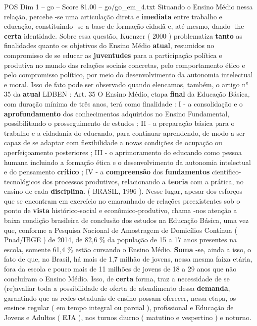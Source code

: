 \begin{textsample}{POS Dim 1 – go – Score 81.00 – go/go\_em\_4.txt}
Situando o Ensino Médio nessa relação, percebe -se uma articulação direta e \textbf{imediata} entre trabalho e educação, constituindo -se a base de formação cidadã e, até mesmo, dando -lhe \textbf{certa} identidade.
Sobre essa questão, Kuenzer ( 2000 ) problematiza \textbf{tanto} as finalidades quanto os objetivos do Ensino Médio \textbf{atual}, resumidos no compromisso de se educar as \textbf{juventudes} para a participação política e produtiva no mundo das relações sociais concretas, pelo comportamento ético e pelo compromisso político, por meio do desenvolvimento da autonomia intelectual e moral.
Isso de fato pode ser observado quando elencamos, também, o artigo n{\EmojiFont °} 35 da \textbf{atual} LDBEN : Art. 35 O Ensino Médio, etapa \textbf{final} da Educação Básica, com duração mínima de três anos, terá como finalidade : I - a consolidação e o \textbf{aprofundamento} dos conhecimentos adquiridos no Ensino Fundamental, possibilitando o prosseguimento de estudos ; II - a preparação básica para o trabalho e a cidadania do educando, para continuar aprendendo, de modo a ser capaz de se adaptar com flexibilidade a novas condições de ocupação ou aperfeiçoamento posteriores ; III - o aprimoramento do educando como pessoa humana incluindo a formação ética e o desenvolvimento da autonomia intelectual e do pensamento \textbf{crítico} ; IV - a \textbf{compreensão} dos \textbf{fundamentos} científico-tecnológicos dos processos produtivos, relacionando a \textbf{teoria} com a prática, no ensino de cada \textbf{disciplina}. ( BRASIL, 1996 ).
Nesse lugar, apesar dos esforços que se encontram em exercício no emaranhado de relações preexistentes sob o ponto de \textbf{vista} histórico-social e econômico-produtivo, chama -nos atenção a baixa condição brasileira de conclusão dos estudos na Educação Básica, uma vez que, conforme a Pesquisa Nacional de Amostragem de Domicílios Contínua ( Pnad/IBGE ) de 2014, de 82,6 \% da população de 15 a 17 anos presentes na escola, somente 61,4 \% estão cursando o Ensino Médio. \textbf{Soma} -se, ainda a isso, o fato de que, no Brasil, há mais de 1,7 milhão de jovens, nessa mesma faixa etária, fora da escola e pouco mais de 11 milhões de jovens de 18 a 29 anos que não concluíram o Ensino Médio.
Isso, de \textbf{certa} forma, traz a necessidade de se (re)avaliar toda a possibilidade de oferta de atendimento dessa \textbf{demanda}, garantindo que as redes estaduais de ensino possam oferecer, nessa etapa, os ensinos regular ( em tempo integral ou parcial ), profissional e Educação de Jovens e Adultos ( EJA ), nos turnos diurno ( matutino e vespertino ) e noturno.

\end{textsample}
